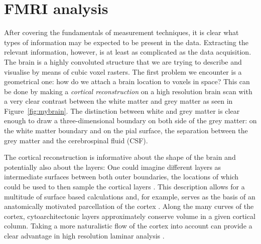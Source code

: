 \section*{FMRI analysis}
After covering the fundamentals of measurement techniques, it is clear what types of information may be expected to be present in the data. Extracting the relevant information, however, is at least as complicated as the data acquisition. The brain is a highly convoluted structure that we are trying to describe and visualise by means of cubic voxel rasters. The first problem we encounter is a geometrical one: how do we attach a brain location to voxels in space? This can be done by making a \emph{cortical reconstruction} on a high resolution brain scan \cite{Dale1999,Bazin2012} with a very clear contrast between the white matter and grey matter as seen in Figure~\ref{fig:mybrain}. The distinction between white and grey matter is clear enough to draw a three-dimensional boundary on both side of the grey matter: on the white matter boundary and on the pial surface, the separation between the grey matter and the cerebrospinal fluid (CSF).

The cortical reconstruction is informative about the shape of the brain and potentially also about the layers: One could imagine different layers as intermediate surfaces between both outer boundaries, the locations of which could be used to then sample the cortical layers \cite{Koopmans2011,Polimeni2010,DeMartino2013}. This description allows for a multitude of surface based calculations \cite{Fischl2000,Bazin2012} and, for example, serves as the basis of an anatomically motivated parcellation of the cortex  \cite{Bok1929,Waehnert2014}. Along the many curves of the cortex, cytoarchitectonic layers approximately conserve volume in a given cortical column. Taking a more naturalistic flow of the cortex into account can provide a clear advantage in high resolution laminar analysis \cite{Waehnert2014}. 

